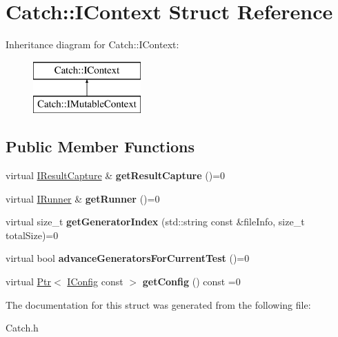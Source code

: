 \hypertarget{struct_catch_1_1_i_context}{\section{Catch\-:\-:I\-Context Struct Reference}
\label{struct_catch_1_1_i_context}
}
Inheritance diagram for Catch\-:\-:I\-Context\-:\begin{figure}[H]
\begin{center}
\leavevmode
\includegraphics[height=2.000000cm]{struct_catch_1_1_i_context}
\end{center}
\end{figure}
\subsection*{Public Member Functions}
\begin{DoxyCompactItemize}
\item 
\hypertarget{struct_catch_1_1_i_context_a7df92cdf3d2600866bf5aeb56c236cf9}{virtual \hyperlink{struct_catch_1_1_i_result_capture}{I\-Result\-Capture} \& {\bfseries get\-Result\-Capture} ()=0}\label{struct_catch_1_1_i_context_a7df92cdf3d2600866bf5aeb56c236cf9}

\item 
\hypertarget{struct_catch_1_1_i_context_a8106d887b354016f3d79449731b459b9}{virtual \hyperlink{struct_catch_1_1_i_runner}{I\-Runner} \& {\bfseries get\-Runner} ()=0}\label{struct_catch_1_1_i_context_a8106d887b354016f3d79449731b459b9}

\item 
\hypertarget{struct_catch_1_1_i_context_a43e07088db43299ba129fbe6d3106e95}{virtual size\-\_\-t {\bfseries get\-Generator\-Index} (std\-::string const \&file\-Info, size\-\_\-t total\-Size)=0}\label{struct_catch_1_1_i_context_a43e07088db43299ba129fbe6d3106e95}

\item 
\hypertarget{struct_catch_1_1_i_context_a806f7c4ed24d51adae90418e661b24b7}{virtual bool {\bfseries advance\-Generators\-For\-Current\-Test} ()=0}\label{struct_catch_1_1_i_context_a806f7c4ed24d51adae90418e661b24b7}

\item 
\hypertarget{struct_catch_1_1_i_context_aee81c415899262e096ad8d6f686fa365}{virtual \hyperlink{class_catch_1_1_ptr}{Ptr}$<$ \hyperlink{struct_catch_1_1_i_config}{I\-Config} const  $>$ {\bfseries get\-Config} () const =0}\label{struct_catch_1_1_i_context_aee81c415899262e096ad8d6f686fa365}

\end{DoxyCompactItemize}


The documentation for this struct was generated from the following file\-:\begin{DoxyCompactItemize}
\item 
Catch.\-h\end{DoxyCompactItemize}

